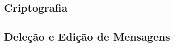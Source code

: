 \documentclass[../main.tex]{subfiles}
\begin{document}
\subsection{Criptografia}



\subsection{Deleção e Edição de Mensagens}


\end{document}
